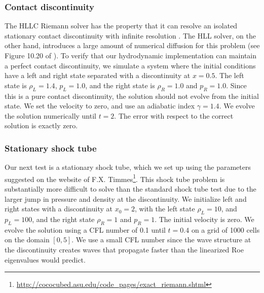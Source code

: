 \documentclass[fleqn,usenatbib]{mnras}
\begin{document}
\subsubsection{Contact discontinuity}
The HLLC Riemann solver has the property that it can resolve an isolated stationary contact discontinuity with infinite resolution \citep{Toro_2013}. The HLL solver, on the other hand, introduces a large amount of numerical diffusion for this problem (see Figure 10.20 of \citealt{Toro_2013}). To verify that our hydrodynamic implementation can maintain a perfect contact discontinuity, we simulate a system where the initial conditions have a left and right state separated with a discontinuity at $x = 0.5$. The left state is $\rho_L = 1.4$, $p_L = 1.0$, and the right state is $\rho_R = 1.0$ and $p_R = 1.0$. Since this is a pure contact discontinuity, the solution should not evolve from the initial state. We set the velocity to zero, and use an adiabatic index $\gamma = 1.4$. We evolve the solution numerically until $t = 2$. The error with respect to the correct solution is exactly zero.

\subsubsection{Stationary shock tube}
\label{section:shocktube}
Our next test is a stationary shock tube, which we set up using the parameters suggested on the website of F.X. Timmes\footnote{\url{http://cococubed.asu.edu/code_pages/exact_riemann.shtml}}. This shock tube problem is substantially more difficult to solve than the standard \cite{Sod_1978} shock tube test due to the larger jump in pressure and density at the discontinuity. We initialize left and right states with a discontinuity at $x_0 = 2$, with the left state $\rho_L = 10$, and $p_L = 100$, and the right state $\rho_R = 1$ and $p_R = 1$. The initial velocity is zero. We evolve the solution using a CFL number of 0.1 until $t = 0.4$ on a grid of 1000 cells on the domain $[0, 5]$. We use a small CFL number since the wave structure at the discontinuity creates waves that propagate faster than the linearized Roe eigenvalues would predict.
\end{document}
